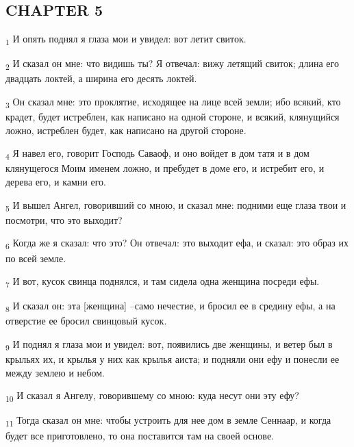 \subsection{CHAPTER 5}
\begin{tcolorbox}
\textsubscript{1} И опять поднял я глаза мои и увидел: вот летит свиток.
\end{tcolorbox}
\begin{tcolorbox}
\textsubscript{2} И сказал он мне: что видишь ты? Я отвечал: вижу летящий свиток; длина его двадцать локтей, а ширина его десять локтей.
\end{tcolorbox}
\begin{tcolorbox}
\textsubscript{3} Он сказал мне: это проклятие, исходящее на лице всей земли; ибо всякий, кто крадет, будет истреблен, как написано на одной стороне, и всякий, клянущийся ложно, истреблен будет, как написано на другой стороне.
\end{tcolorbox}
\begin{tcolorbox}
\textsubscript{4} Я навел его, говорит Господь Саваоф, и оно войдет в дом татя и в дом клянущегося Моим именем ложно, и пребудет в доме его, и истребит его, и дерева его, и камни его.
\end{tcolorbox}
\begin{tcolorbox}
\textsubscript{5} И вышел Ангел, говоривший со мною, и сказал мне: подними еще глаза твои и посмотри, что это выходит?
\end{tcolorbox}
\begin{tcolorbox}
\textsubscript{6} Когда же я сказал: что это? Он отвечал: это выходит ефа, и сказал: это образ их по всей земле.
\end{tcolorbox}
\begin{tcolorbox}
\textsubscript{7} И вот, кусок свинца поднялся, и там сидела одна женщина посреди ефы.
\end{tcolorbox}
\begin{tcolorbox}
\textsubscript{8} И сказал он: эта [женщина] --само нечестие, и бросил ее в средину ефы, а на отверстие ее бросил свинцовый кусок.
\end{tcolorbox}
\begin{tcolorbox}
\textsubscript{9} И поднял я глаза мои и увидел: вот, появились две женщины, и ветер был в крыльях их, и крылья у них как крылья аиста; и подняли они ефу и понесли ее между землею и небом.
\end{tcolorbox}
\begin{tcolorbox}
\textsubscript{10} И сказал я Ангелу, говорившему со мною: куда несут они эту ефу?
\end{tcolorbox}
\begin{tcolorbox}
\textsubscript{11} Тогда сказал он мне: чтобы устроить для нее дом в земле Сеннаар, и когда будет все приготовлено, то она поставится там на своей основе.
\end{tcolorbox}
